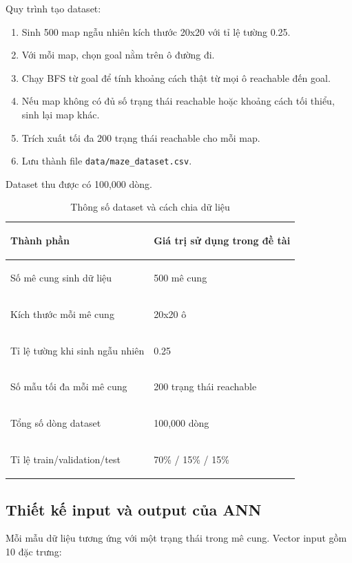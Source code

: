 \documentclass[12pt,a4paper]{article}
\begin{document}
Quy trình tạo dataset:

\begin{enumerate}
    \item Sinh 500 map ngẫu nhiên kích thước 20x20 với tỉ lệ tường 0.25.
    \item Với mỗi map, chọn goal nằm trên ô đường đi.
    \item Chạy BFS từ goal để tính khoảng cách thật từ mọi ô reachable đến goal.
    \item Nếu map không có đủ số trạng thái reachable hoặc khoảng cách tối thiểu, sinh lại map khác.
    \item Trích xuất tối đa 200 trạng thái reachable cho mỗi map.
    \item Lưu thành file \texttt{data/maze\_dataset.csv}.
\end{enumerate}

Dataset thu được có 100,000 dòng.

\begin{table}[H]
\centering
\caption{Thông số dataset và cách chia dữ liệu}
\begin{tabularx}{0.92\textwidth}{>{\bfseries\raggedright\arraybackslash}p{}Y}
\toprule
Thành phần & Giá trị sử dụng trong đề tài \\
\midrule
Số mê cung sinh dữ liệu & 500 mê cung \\
Kích thước mỗi mê cung & 20x20 ô \\
Tỉ lệ tường khi sinh ngẫu nhiên & 0.25 \\
Số mẫu tối đa mỗi mê cung & 200 trạng thái reachable \\
Tổng số dòng dataset & 100,000 dòng \\
Tỉ lệ train/validation/test & 70\% / 15\% / 15\% \\
\bottomrule
\end{tabularx}
\end{table}

\subsection{Thiết kế input và output của ANN}

Mỗi mẫu dữ liệu tương ứng với một trạng thái trong mê cung. Vector input gồm 10 đặc trưng:
\end{document}
